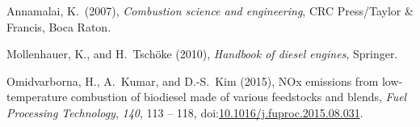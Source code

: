 \documentclass[9pt]{report}
\begin{document}
{\mdsupressbiblabel{}\begin{thebibliography}{3}%
\label{sec-bibliography}%

\mdbibitemlabel{}Annamalai, K.~(2007), \emph{Combustion science and engineering}, CRC Press/Taylor \& Francis, Boca Raton.\label{annamalai2007combustion}%

\mdbibitemlabel{}Mollenhauer, K., and H.~Tschöke (2010), \emph{Handbook of diesel engines}, Springer.\label{mollenhauer2010handbook}%

\mdbibitemlabel{}Omidvarborna, H., A.~Kumar, and D.-S.~Kim (2015), NOx emissions from low-temperature combustion of biodiesel made of various feedstocks and blends, \emph{Fuel Processing Technology}, \emph{140}, 113 – 118, doi:\href{https://dx.doi.org/10.1016/j.fuproc.2015.08.031}{10.1016/j.fuproc.2015.08.031}.\label{omidvarborna2015113}%
\par%
\end{thebibliography}}%
\end{document}

